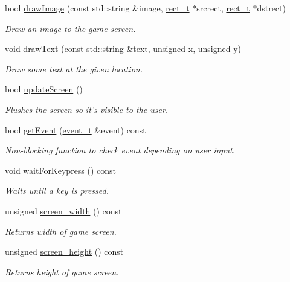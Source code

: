 \begin{DoxyCompactItemize}
bool \hyperlink{classGraphicsEngine_a47be08aa9a766dce3b32b6814fb5b6ed}{draw\-Image} (const std\-::string \&image, \hyperlink{GraphicsEngine_8hh_a9a150f1ad43ec7de65cfe698cdae8bee}{rect\-\_\-t} $\ast$srcrect, \hyperlink{GraphicsEngine_8hh_a9a150f1ad43ec7de65cfe698cdae8bee}{rect\-\_\-t} $\ast$dstrect)
\begin{DoxyCompactList}\small\item\em Draw an image to the game screen. \end{DoxyCompactList}\item 
void \hyperlink{classGraphicsEngine_a82d4584abba7fd03c321a3e418964cac}{draw\-Text} (const std\-::string \&text, unsigned x, unsigned y)
\begin{DoxyCompactList}\small\item\em Draw some text at the given location. \end{DoxyCompactList}\item 
bool \hyperlink{classGraphicsEngine_aeadd04c5518ef05b039241cbb7d09b59}{update\-Screen} ()
\begin{DoxyCompactList}\small\item\em Flushes the screen so it's visible to the user. \end{DoxyCompactList}\item 
bool \hyperlink{classGraphicsEngine_acdcf6935481bebcc5f45e7fd18dcf016}{get\-Event} (\hyperlink{GraphicsEngine_8hh_a2fb9b58e4e5f14f40af8b4a1425841f8}{event\-\_\-t} \&event) const 
\begin{DoxyCompactList}\small\item\em Non-\/blocking function to check event depending on user input. \end{DoxyCompactList}\item 
void \hyperlink{classGraphicsEngine_a4fe915afad2a770445f34ad1f597474a}{wait\-For\-Keypress} () const 
\begin{DoxyCompactList}\small\item\em Waits until a key is pressed. \end{DoxyCompactList}\item 
unsigned \hyperlink{classGraphicsEngine_a7598618ef7de1ba7813e41471938f2c1}{screen\-\_\-width} () const 
\begin{DoxyCompactList}\small\item\em Returns width of game screen. \end{DoxyCompactList}\item 
unsigned \hyperlink{classGraphicsEngine_af7d7440d76fda157dae03aabc9388a83}{screen\-\_\-height} () const 
\begin{DoxyCompactList}\small\item\em Returns height of game screen. \end{DoxyCompactList}\end{DoxyCompactItemize}
